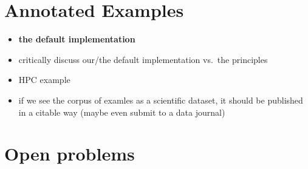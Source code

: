 \documentclass[12pt]{article}
\begin{document}
\section*{Annotated Examples}\label{annotated-examples}

\begin{itemize}
\item
  \textbf{the default implementation}
\item
  critically discuss our/the default implementation vs.~the principles
\item
  HPC example
\item
  if we see the corpus of examles as a scientific dataset, it should be
  published in a citable way (maybe even submit to a data journal)
\end{itemize}

\section*{Open problems}\label{open-problems}
\end{document}
